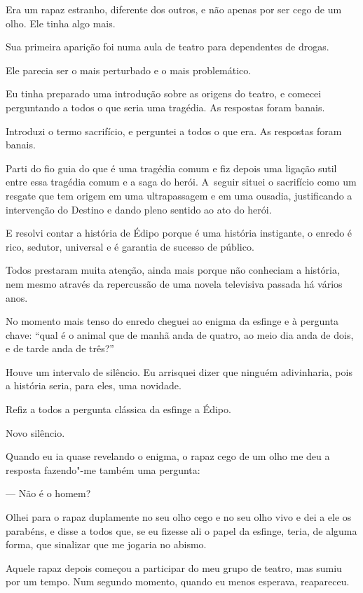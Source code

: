  

Era um rapaz estranho, diferente dos outros, e não apenas por ser cego
de um olho. Ele tinha algo mais.

Sua primeira aparição foi numa aula de teatro para dependentes de
drogas.

Ele parecia ser o mais perturbado e o mais problemático.

Eu tinha preparado uma introdução sobre as origens do teatro, e comecei
perguntando a todos o que seria uma tragédia. As respostas foram banais.

Introduzi o termo sacrifício, e perguntei a todos o que era. As
respostas foram banais.

Parti do fio guia do que é uma tragédia comum e fiz depois uma ligação
sutil entre essa tragédia comum e a saga do herói. A~seguir situei o
sacrifício como um resgate que tem origem em uma ultrapassagem e em uma
ousadia, justificando a intervenção do Destino e dando pleno sentido ao
ato do herói.

E resolvi contar a história de Édipo porque é uma história instigante, o
enredo é rico, sedutor, universal e é garantia de sucesso de público.

Todos prestaram muita atenção, ainda mais porque não conheciam a
história, nem mesmo através da repercussão de uma novela televisiva
passada há vários anos.

No momento mais tenso do enredo cheguei ao enigma da esfinge e à
pergunta chave: ``qual é o animal que de manhã anda de quatro, ao meio
dia anda de dois, e de tarde anda de três?''

Houve um intervalo de silêncio. Eu arrisquei dizer que ninguém
adivinharia, pois a história seria, para eles, uma novidade.

Refiz a todos a pergunta clássica da esfinge a Édipo.

Novo silêncio.

Quando eu ia quase revelando o enigma, o rapaz cego de um olho me deu a
resposta fazendo"-me também uma pergunta:

— Não é o homem?

Olhei para o rapaz duplamente no seu olho cego e no seu olho vivo e dei
a ele os parabéns, e disse a todos que, se eu fizesse ali o papel da
esfinge, teria, de alguma forma, que sinalizar que me jogaria no abismo.

\asterisc{}

Aquele rapaz depois começou a participar do meu grupo de teatro, mas
sumiu por um tempo. Num segundo momento, quando eu menos esperava,
reapareceu.


